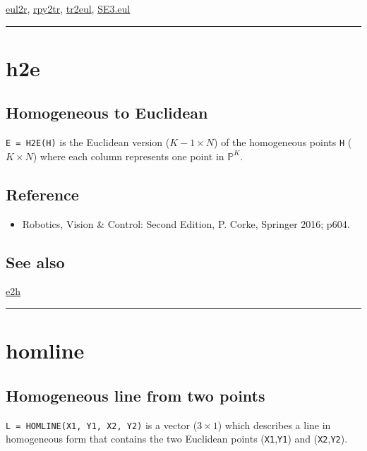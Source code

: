 \hyperlink{eul2r}{\color{blue} eul2r}, \hyperlink{rpy2tr}{\color{blue} rpy2tr}, \hyperlink{tr2eul}{\color{blue} tr2eul}, \hyperlink{SE3.eul}{\color{blue} SE3.eul}

\vspace{1.5ex}\rule{\textwidth}{1mm}

\hypertarget{h2e}{\section*{h2e}}
\subsection*{Homogeneous to Euclidean}


\texttt{E = H2E(H)} is the Euclidean version ($K-1 \times N$) of the homogeneous
points \texttt{H} ($K \times N$) where each column represents one point in $\mathbb{P}^{K}$.


\subsection*{Reference}
\begin{itemize}
  \item Robotics, Vision \& Control: Second Edition, P. Corke, Springer 2016; p604.
\end{itemize}

\subsection*{See also}


\hyperlink{e2h}{\color{blue} e2h}

\vspace{1.5ex}\rule{\textwidth}{1mm}

\hypertarget{homline}{\section*{homline}}
\subsection*{Homogeneous line from two points}


\texttt{L = HOMLINE(X1, Y1, X2, Y2)} is a vector ($3 \times 1$) which describes a line in
homogeneous form that contains the two Euclidean points (\texttt{X1},\texttt{Y1}) and (\texttt{X2},\texttt{Y2}).



